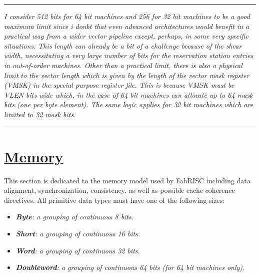 \documentclass{article}
\begin{document}
        \par\noindent\rule{\textwidth}{0.4pt}
        \textit{I consider 512 bits for 64 bit machines and 256 for 32 bit machines to be a good maximum limit since i doubt that even advanced architectures would benefit in a practical way from a wider vector pipeline except, perhaps, in some very specific situations. This length can already be a bit of a challenge because of the shear width, necessitating a very large number of bits for the reservation station entries in out-of-order machines. Other than a practical limit, there is also a physical limit to the vector length which is given by the length of the vector mask register (VMSK) in the special purpose register file. This is because VMSK must be VLEN bits wide which, in the case of 64 bit machines can allocate up to 64 mask bits (one per byte element). The same logic applies for 32 bit machines which are limited to 32 mask bits.}
        \par\noindent\rule{\textwidth}{0.4pt}

    \clearpage


    \section[Memory]{\LARGE\underline{Memory}} %

        \vspace{10pt}

        This section is dedicated to the memory model used by FabRISC including data alignment, synchronization, consistency, as well as possible cache coherence directives. All primitive data types must have one of the following sizes:

        \begin{itemize}

            \item \textit{\textbf{Byte}: a grouping of continuous 8 bits.}
            \item \textit{\textbf{Short}: a grouping of continuous 16 bits.}
            \item \textit{\textbf{Word}: a grouping of continuous 32 bits.}
            \item \textit{\textbf{Doubleword}: a grouping of continuous 64 bits (for 64 bit machines only).}

        \end{itemize}
\end{document}
